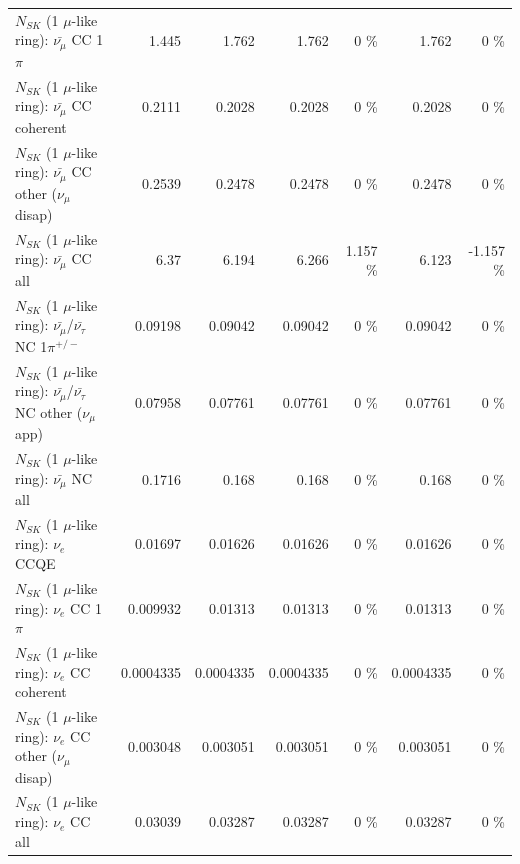 \begin{table}
\begin{tabular}{| l | r | r | r  r | r  r |}
                         $N_{SK}$ (1 $\mu$-like ring): $\bar{\nu_\mu}$ CC 1$\pi$ &           1.445 &           1.762 &           1.762 &        0 \%  &           1.762 &        0 \%  \\ 
                       $N_{SK}$ (1 $\mu$-like ring): $\bar{\nu_\mu}$ CC coherent &          0.2111 &          0.2028 &          0.2028 &        0 \%  &          0.2028 &        0 \%  \\ 
        $N_{SK}$ (1 $\mu$-like ring): $\bar{\nu_\mu}$ CC other ($\nu_\mu$ disap) &          0.2539 &          0.2478 &          0.2478 &        0 \%  &          0.2478 &        0 \%  \\ 
                          $N_{SK}$ (1 $\mu$-like ring): $\bar{\nu_{\mu}}$ CC all &            6.37 &           6.194 &           6.266 &    1.157 \%  &           6.123 &   -1.157 \%  \\ 
\hline
  $N_{SK}$ (1 $\mu$-like ring): $\bar{\nu_\mu}$/$\bar{\nu_\tau}$ NC 1$\pi^{+/-}$ &         0.09198 &         0.09042 &         0.09042 &        0 \%  &         0.09042 &        0 \%  \\ 
$N_{SK}$ (1 $\mu$-like ring): $\bar{\nu_\mu}$/$\bar{\nu_\tau}$ NC other ($\nu_\mu$ app) &         0.07958 &         0.07761 &         0.07761 &        0 \%  &         0.07761 &        0 \%  \\ 
                          $N_{SK}$ (1 $\mu$-like ring): $\bar{\nu_{\mu}}$ NC all &          0.1716 &           0.168 &           0.168 &        0 \%  &           0.168 &        0 \%  \\ 
\hline
\hline
\hline
                                      $N_{SK}$ (1 $\mu$-like ring): $\nu_e$ CCQE &         0.01697 &         0.01626 &         0.01626 &        0 \%  &         0.01626 &        0 \%  \\ 
                                 $N_{SK}$ (1 $\mu$-like ring): $\nu_e$ CC 1$\pi$ &        0.009932 &         0.01313 &         0.01313 &        0 \%  &         0.01313 &        0 \%  \\ 
                               $N_{SK}$ (1 $\mu$-like ring): $\nu_e$ CC coherent &       0.0004335 &       0.0004335 &       0.0004335 &        0 \%  &       0.0004335 &        0 \%  \\ 
                $N_{SK}$ (1 $\mu$-like ring): $\nu_e$ CC other ($\nu_\mu$ disap) &        0.003048 &        0.003051 &        0.003051 &        0 \%  &        0.003051 &        0 \%  \\ 
                                  $N_{SK}$ (1 $\mu$-like ring): $\nu_{e}$ CC all &         0.03039 &         0.03287 &         0.03287 &        0 \%  &         0.03287 &        0 \%  \\ 

\end{tabular}
\end{table}
